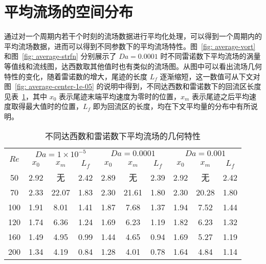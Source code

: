 \section{平均流场的空间分布}\label{sec: average}


通过对一个周期内若干个时刻的流场数据进行平均化处理，可以得到一个周期内的平均流场数据，进而可以得到不同参数下的平均流场特性。图~\ref{fig: average-vort} 和图~\ref{fig: average-strfn} 分别展示了 $Da=0.0001$ 时不同雷诺数下平均流场的涡量等值线和流线图，达西数取其他值时也有类似的流场图。从图中可以看出流场几何特性的变化，随着雷诺数的增大，尾迹的长度 $L_f$ 逐渐缩短，这一数值可从下文对图~\ref{fig: average-center-1e-05} 的说明中得到，不同达西数和雷诺数下的回流区长度见表~\ref{tab: geometry}，其中 $x_0$ 表示尾迹末端平均速度为零时的位置，$x_m$ 表示尾迹之后平均速度取得最大值时的位置，$L_f$ 即为回流区的长度，均在下文平均量的分布中有所说明。

\begin{table}[ht]
	\caption{不同达西数和雷诺数下平均流场的几何特性}\label{tab: geometry}
	\vspace{.5em}\centering\wuhao
	\begin{tabular}{*{10}{c}}
		\toprule[1.5pt]
		\multirow{2}[3]{*}{$Re$} & \multicolumn{3}{c}{$Da=1\times 10^{-5}$} & \multicolumn{3}{c}{$Da=0.0001$} & \multicolumn{3}{c}{$Da=0.001$} \\
		\cmidrule[.67pt](lr){2-4} \cmidrule[.67pt](lr){5-7} \cmidrule[.67pt](lr){8-10}
		& $x_0$ & $x_m$ & $L_f$ & $x_0$ & $x_m$ & $L_f$ & $x_0$ & $x_m$ & $L_f$ \\
		\midrule[1pt]
		50	& 2.92 & 无    & 2.42 & 2.89 & 无    & 2.39 & 2.92 & 无    & 2.42 \\
		70	& 2.33 & 22.07 & 1.83 & 2.30 & 21.61 & 1.80 & 2.30 & 20.28 & 1.80 \\
		100 & 1.91 & 8.01  & 1.41 & 1.87 & 7.68  & 1.37 & 1.94 & 7.52  & 1.44 \\
		120 & 1.74 & 6.36  & 1.24 & 1.69 & 6.23  & 1.19 & 1.82 & 6.23  & 1.32 \\
		160 & 1.49 & 4.95  & 0.99 & 1.44 & 4.65  & 0.94 & 1.69 & 5.27  & 1.19 \\
		200 & 1.34 & 4.19  & 0.84 & 1.28 & 4.01  & 0.78 & 1.64 & 4.84  & 1.14 \\
		\bottomrule[1.5pt]
	\end{tabular}
\end{table}

